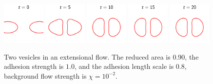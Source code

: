 \documentclass[%
preprint,
 amsmath,amssymb,
 aps,
]{revtex4-1}
\begin{document}
\begin{figure}[htp]
  \includegraphics[width = 0.19\textwidth]{figs/extensional_adR8em1adS1e0_ra090_timestep1.pdf}
  \includegraphics[width = 0.19\textwidth]{figs/extensional_adR8em1adS1e0_ra090_timestep2.pdf}
  \includegraphics[width = 0.19\textwidth]{figs/extensional_adR8em1adS1e0_ra090_timestep3.pdf}
  \includegraphics[width = 0.19\textwidth]{figs/extensional_adR8em1adS1e0_ra090_timestep4.pdf}
  \includegraphics[width = 0.19\textwidth]{figs/extensional_adR8em1adS1e0_ra090_timestep5.pdf}
  \caption{Two vesicles in an extensional flow.  The reduced area is
  $0.90$, the adhesion strength is $1.0$, and the adhesion length scale
is $0.8$, background flow strength is $\chi = 10^{-2}$.}
\end{figure}


\end{document}
